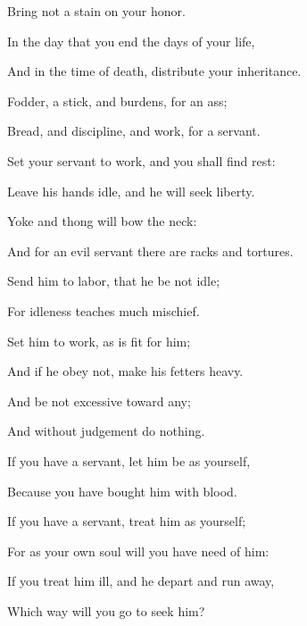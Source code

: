 {\par }{\Q Bring not a stain on your honor.
\par }{\Q {}In the day that you end the days of your life,
\par }{\Q And in the time of death, distribute your inheritance.
\par }{\BB \par }{\Q {}Fodder, a stick, and burdens, for an ass;
\par }{\Q Bread, and discipline, and work, for a servant.
\par }{\Q {}Set your servant to work, and you shall find rest:
\par }{\Q Leave his hands idle, and he will seek liberty.
\par }{\Q {}Yoke and thong will bow the neck:
\par }{\Q And for an evil servant there are racks and tortures.
\par }{\Q {}Send him to labor, that he be not idle;
\par }{\Q For idleness teaches much mischief.
\par }{\Q {}Set him to work, as is fit for him;
\par }{\Q And if he obey not, make his fetters heavy.
\par }{\Q {}And be not excessive toward any;
\par }{\Q And without judgement do nothing.
\par }{\BB \par }{\Q {}If you have a servant, let him be as yourself,
\par }{\Q Because you have bought him with blood.
\par }{\Q {}If you have a servant, treat him as yourself;
\par }{\Q {} For as your own soul will you have need of him:
\par }{\Q If you treat him ill, and he depart and run away,
\par }{\Q Which way will you go to seek him?
\par }{\BB \par }
